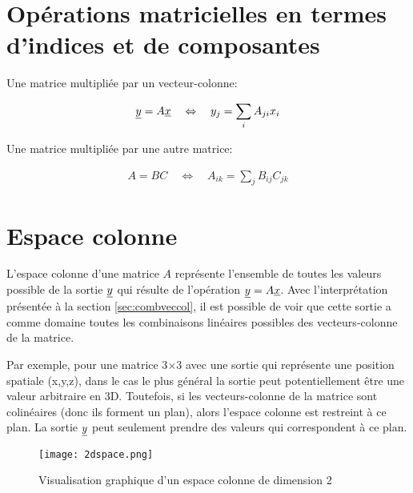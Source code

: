 \section{Opérations matricielles en termes d'indices et de composantes}
\label{sec:opmatind}

Une matrice multipliée par un vecteur-colonne:

\begin{align}
	\underline{y}  = A \underline{x}
	\quad \Leftrightarrow \quad
	y_j = \sum_i{A_{ji} x_i }
\end{align}

Une matrice multipliée par une autre matrice:

\begin{align}
	A  = B C
	\quad \Leftrightarrow \quad
	A_{ik} = \sum_j{B_{ij} C_{jk} }
\end{align}


\section{Espace colonne}
\label{sec:espcol}

L'espace colonne d'une matrice $A$ représente l'ensemble de toutes les valeurs possible de la sortie $\underline{y}$ qui résulte de l'opération $\underline{y} = A \underline{x}$. Avec l'interprétation présentée à la section \ref{sec:combveccol}, il est possible de voir que cette sortie a comme domaine toutes les combinaisons linéaires possibles des vecteurs-colonne de la matrice.

Par exemple, pour une matrice 3$\times$3 avec une sortie qui représente une position spatiale (x,y,z), dans le cas le plus général la sortie peut potentiellement être une valeur arbitraire en 3D. Toutefois, si les vecteurs-colonne de la matrice sont colinéaires (donc ils forment un plan), alors l'espace colonne est restreint à ce plan. La sortie $\underline{y}$ peut seulement prendre des valeurs qui correspondent à ce plan.

\begin{figure}[H]
	\centering
	\texttt{[image: 2dspace.png]}
	\caption{Visualisation graphique d'un espace colonne de dimension 2}
	\label{fig:2dspace}
\end{figure}


